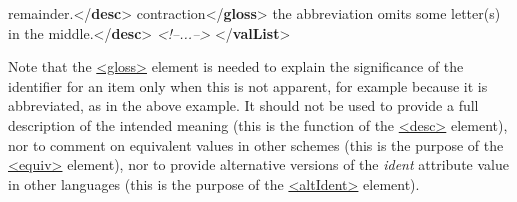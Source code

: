 \begin{shaded}
\hspace*{1em}\hspace*{1em}\hspace*{1em}\hspace*{1em} remainder.{</\textbf{desc}>}\mbox{}\newline 
{}\mbox{}\newline 
{}\mbox{}\newline 
\hspace*{1em}contraction{</\textbf{gloss}>}\mbox{}\newline 
\hspace*{1em}the abbreviation omits some letter(s) in the middle.{</\textbf{desc}>}\mbox{}\newline 
{}\mbox{}\newline 
\textit{<!--...-->}\mbox{}\newline 
{</\textbf{valList}>}\end{shaded}\egroup\par \par
Note that the \hyperref[TEI.gloss]{<gloss>} element is needed to explain the significance of the identifier for an item only when this is not apparent, for example because it is abbreviated, as in the above example. It should not be used to provide a full description of the intended meaning (this is the function of the \hyperref[TEI.desc]{<desc>} element), nor to comment on equivalent values in other schemes (this is the purpose of the \hyperref[TEI.equiv]{<equiv>} element), nor to provide alternative versions of the {\itshape ident} attribute value in other languages (this is the purpose of the \hyperref[TEI.altIdent]{<altIdent>} element).\par
